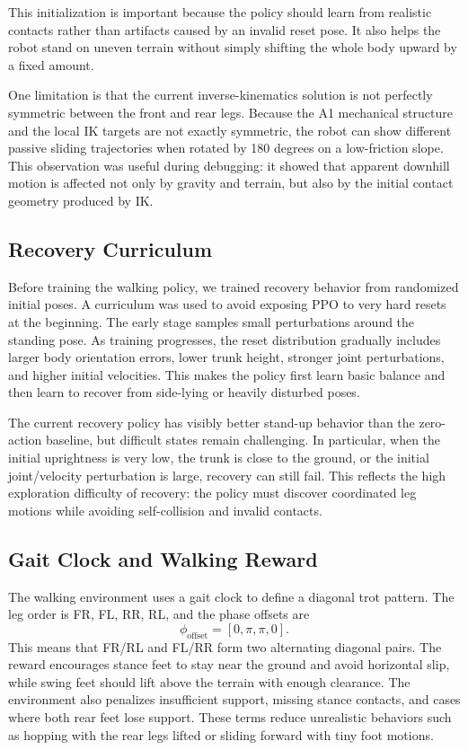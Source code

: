 \documentclass[conference]{IEEEtran}
\begin{document}
This initialization is important because the policy should learn from realistic contacts rather than artifacts caused by an invalid reset pose. It also helps the robot stand on uneven terrain without simply shifting the whole body upward by a fixed amount.

One limitation is that the current inverse-kinematics solution is not perfectly symmetric between the front and rear legs. Because the A1 mechanical structure and the local IK targets are not exactly symmetric, the robot can show different passive sliding trajectories when rotated by 180 degrees on a low-friction slope. This observation was useful during debugging: it showed that apparent downhill motion is affected not only by gravity and terrain, but also by the initial contact geometry produced by IK.

\subsection{Recovery Curriculum}
Before training the walking policy, we trained recovery behavior from randomized initial poses. A curriculum was used to avoid exposing PPO to very hard resets at the beginning. The early stage samples small perturbations around the standing pose. As training progresses, the reset distribution gradually includes larger body orientation errors, lower trunk height, stronger joint perturbations, and higher initial velocities. This makes the policy first learn basic balance and then learn to recover from side-lying or heavily disturbed poses.

The current recovery policy has visibly better stand-up behavior than the zero-action baseline, but difficult states remain challenging. In particular, when the initial uprightness is very low, the trunk is close to the ground, or the initial joint/velocity perturbation is large, recovery can still fail. This reflects the high exploration difficulty of recovery: the policy must discover coordinated leg motions while avoiding self-collision and invalid contacts.

\subsection{Gait Clock and Walking Reward}
The walking environment uses a gait clock to define a diagonal trot pattern. The leg order is FR, FL, RR, RL, and the phase offsets are
\begin{equation}
\phi_{\mathrm{offset}} = [0,\pi,\pi,0].
\end{equation}
This means that FR/RL and FL/RR form two alternating diagonal pairs. The reward encourages stance feet to stay near the ground and avoid horizontal slip, while swing feet should lift above the terrain with enough clearance. The environment also penalizes insufficient support, missing stance contacts, and cases where both rear feet lose support. These terms reduce unrealistic behaviors such as hopping with the rear legs lifted or sliding forward with tiny foot motions.
\end{document}
